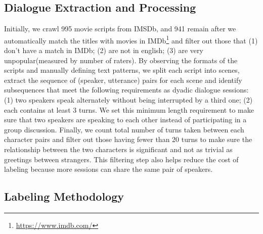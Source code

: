 \subsection{Dialogue Extraction and Processing}
Initially, we crawl 995 movie scripts from IMSDb, and 941 remain after 
we automatically match the titles with movies in 
IMDb\footnote{\url{https://www.imdb.com/}} and filter out those that 
(1) don't have a match in IMDb; (2) are not in english; 
(3) are very unpopular(measured by number of raters). 
By observing the formats of the scripts and manually defining text patterns, 
we split each script into scenes, extract the sequence of (speaker, utterance) 
pairs for each scene and identify subsequences that meet the following requirements  
as dyadic dialogue sessions: 
(1) two speakers speak alternately without being interrupted 
by a third one; 
(2) each contains at least 3 turns. 
We set this minimum length requirement to make sure 
that two speakers are speaking to each other instead of 
participating in a group discussion. 
Finally, we count total number of turns taken 
between each character pairs and filter out those having 
fewer than 20 turns to 
make sure the relationship between the two characters is significant 
and not as trivial as greetings between strangers. 
This filtering step also helps reduce the cost of labeling 
because more sessions can share the same pair of speakers.

\subsection{Labeling Methodology}
